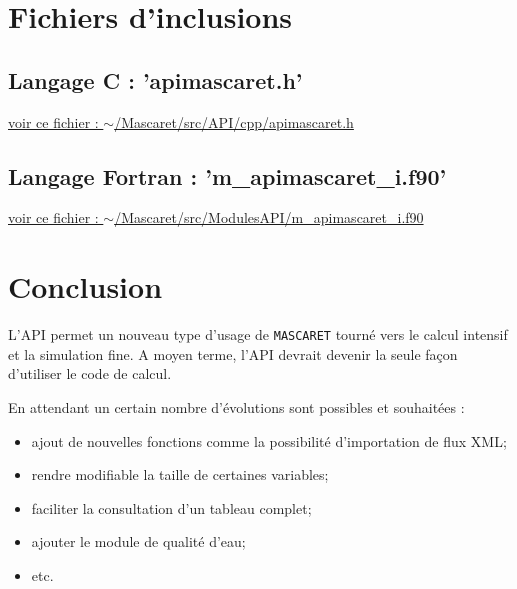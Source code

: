 \documentclass[a4paper,11pt]{article}
\begin{document}
  
\section{Fichiers d'inclusions}

\label{les includes}

\subsection{Langage C : 'apimascaret.h'}

\href{run:../../../src/API/cpp/apimascaret.h}{voir ce fichier : \hspace{0.5cm}$\sim$/Mascaret/src/API/cpp/apimascaret.h}

\subsection{Langage Fortran : 'm\_apimascaret\_i.f90'}

\href{run:../../../src/ModulesAPI/m\_apimascaret\_i.f90}{voir ce fichier :  \hspace{0.5cm}$\sim$/Mascaret/src/ModulesAPI/m\_apimascaret\_i.f90}

\section{Conclusion}

L'API permet un nouveau type d'usage de \texttt{MASCARET} tourn\'e vers le calcul intensif et la simulation fine. A moyen terme, l'API devrait devenir la seule fa\c{c}on d'utiliser le code de calcul.

\vspace{0.5cm}

En attendant un certain nombre d'\'evolutions sont possibles et souhait\'ees :

\vspace{0.5cm}

\begin{itemize}
   \item ajout de nouvelles fonctions comme la possibilit\'e d'importation de flux XML;
   \vspace{0.5cm}
   \item rendre modifiable la taille de certaines variables;
   \vspace{0.5cm}
   \item faciliter la consultation d'un tableau complet;
   \vspace{0.5cm}
   \item ajouter le module de qualit\'e d'eau;
   \vspace{0.5cm}
   \item etc.
\end{itemize}


%
%
\end{document}
